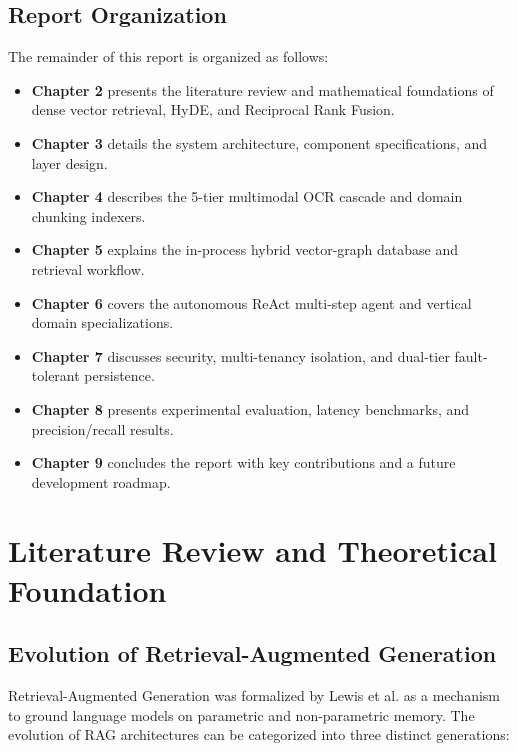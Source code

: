 \documentclass[12pt,a4paper,oneside]{report}
\begin{document}
\section{Report Organization}
The remainder of this report is organized as follows:
\begin{itemize}[itemsep=2pt]
    \item \textbf{Chapter 2} presents the literature review and mathematical foundations of dense vector retrieval, HyDE, and Reciprocal Rank Fusion.
    \item \textbf{Chapter 3} details the system architecture, component specifications, and layer design.
    \item \textbf{Chapter 4} describes the 5-tier multimodal OCR cascade and domain chunking indexers.
    \item \textbf{Chapter 5} explains the in-process hybrid vector-graph database and retrieval workflow.
    \item \textbf{Chapter 6} covers the autonomous ReAct multi-step agent and vertical domain specializations.
    \item \textbf{Chapter 7} discusses security, multi-tenancy isolation, and dual-tier fault-tolerant persistence.
    \item \textbf{Chapter 8} presents experimental evaluation, latency benchmarks, and precision/recall results.
    \item \textbf{Chapter 9} concludes the report with key contributions and a future development roadmap.
\end{itemize}

\newpage

\chapter{Literature Review and Theoretical Foundation}

\section{Evolution of Retrieval-Augmented Generation}
Retrieval-Augmented Generation was formalized by Lewis et al. as a mechanism to ground language models on parametric and non-parametric memory. The evolution of RAG architectures can be categorized into three distinct generations:
\end{document}
